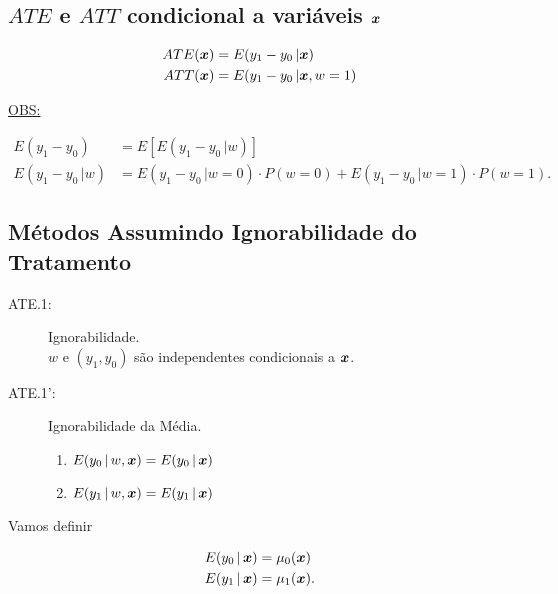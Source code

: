 \documentclass[11pt,oneside,a4paper]{article}
\numberwithin{equation}{section}
\begin{document}
\begin{description}
\begin{description}
\subsection*{$ATE$ e $ATT$ condicional a variáveis $\boldsymbol{x}$ }

\vspace{-1 em}
\begin{align*}
ATE( \boldsymbol{x} ) &= E( y_1 - y_0 \, | \boldsymbol{x})
\\
ATT( \boldsymbol{x} ) &= E( y_1 - y_0 \, | \boldsymbol{x}, w = 1)
\end{align*}

\noindent
\underline{OBS:}

\vspace{-1 em}
\begin{align*}
E( y_1 - y_0 ) &= E \left[ E( y_1 - y_0 \, | w) \right]
\\
E( y_1 - y_0 \, | w ) &=
E( y_1 - y_0 \, | w = 0 ) \cdot P(w=0)
+
E( y_1 - y_0 \, | w = 1 ) \cdot P(w=1).
\end{align*}

\subsection*{Métodos Assumindo Ignorabilidade do Tratamento}

\begin{description}
\item[ATE.1:] Ignorabilidade. 
\\
$w$ e $(y_{1}, y_{0})$ são independentes condicionais a $\boldsymbol{x}$.

\item[ATE.1':] Ignorabilidade da Média. 

\vspace{-.75 em}
\begin{enumerate}[label =\alph*)] \itemsep0pt
\item $E( y_{0} \, | \, w, \boldsymbol{x} ) = E( y_{0} \, | \, \boldsymbol{x} )$
\item $E( y_{1} \, | \, w, \boldsymbol{x} ) = E( y_{1} \, | \, \boldsymbol{x} )$
\end{enumerate}

\end{description}

Vamos definir

\vspace{-1 em}
\begin{align*}
E( y_{0} \, | \, \boldsymbol{x} ) &= \mu_{0}( \boldsymbol{x} )
\\
E( y_{1} \, | \, \boldsymbol{x} ) &= \mu_{1}( \boldsymbol{x} ).
\end{align*}


\end{description}
\end{description}
\end{document}
